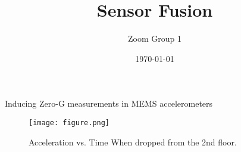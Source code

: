 \documentclass[10pt]{beamer}
\title{Sensor Fusion}
\author{Zoom Group 1}
\date{\today}
\theoremstyle{definition}
\begin{document}
\frame{\titlepage}


\begin{frame}{Inducing Zero-G measurements in MEMS accelerometers}
\begin{figure}
    \texttt{[image: figure.png]}
    \caption{Acceleration vs. Time When dropped from the 2nd floor.}
    \label{fig:my_label}
\end{figure}
\end{frame}



% 
% 
\end{document}
